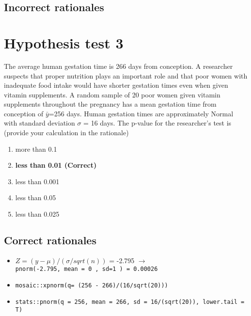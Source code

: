 \documentclass[letterpaper,9pt,twoside,printwatermark=false]{pinp}
\providecommand{\tightlist}{%
  \setlength{\itemsep}{0pt}\setlength{\parskip}{0pt}}
\begin{document}
\hypertarget{incorrect-rationales-1}{%
\subsection{Incorrect rationales}\label{incorrect-rationales-1}}

\hypertarget{hypothesis-test-3}{%
\section{Hypothesis test 3}\label{hypothesis-test-3}}

The average human gestation time is 266 days from conception. A
researcher suspects that proper nutrition plays an important role and
that poor women with inadequate food intake would have shorter gestation
times even when given vitamin supplements. A random sample of 20 poor
women given vitamin supplements throughout the pregnancy has a mean
gestation time from conception of \(\bar{y}\)=256 days. Human gestation
times are approximately Normal with standard deviation \(\sigma\) = 16
days. The p-value for the researcher's test is (provide your calculation
in the rationale)

\begin{enumerate}
\def\labelenumi{\alph{enumi}.}
\tightlist
\item
  more than 0.1
\item
  \textbf{less than 0.01 (Correct)}
\item
  less than 0.001
\item
  less than 0.05
\item
  less than 0.025
\end{enumerate}

\hypertarget{correct-rationales-2}{%
\subsection{Correct rationales}\label{correct-rationales-2}}

\begin{itemize}
\tightlist
\item
  \(Z= (y - \mu)/ (\sigma / sqrt (n))\) = -2.795 \(\to\)
  \texttt{pnorm(-2.795,\ mean\ =\ 0\ ,\ sd=1\ )\ =\ 0.00026}
\item
  \texttt{mosaic::xpnorm(q=\ (256\ -\ 266)/(16/sqrt(20)))}
\item
  \texttt{stats::pnorm(q\ =\ 256,\ mean\ =\ 266,\ sd\ =\ 16/(sqrt(20)),\ lower.tail\ =\ T)}
\end{itemize}
\end{document}
